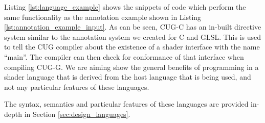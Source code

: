 \documentclass[a4paper,12pt,twoside,openright]{report}
\begin{document}
Listing \ref{lst:language_example} shows the snippets of code which perform the
same functionality as the annotation example shown in Listing
\ref{lst:annotation_example_input}. As can be seen, CUG-C has an in-built
directive system similar to the annotation system we created for C and GLSL.
This is used to tell the CUG compiler about the existence of a shader interface
with the name ``main''. The compiler can then check for conformance of that
interface when compiling CUG-G. We are aiming show the general benefits of
programming in a shader language that is derived from the host language that is
being used, and not any particular features of these languages.

The syntax, semantics and particular features of these languages are provided
in-depth in Section \ref{sec:design_languages}.












\end{document}
